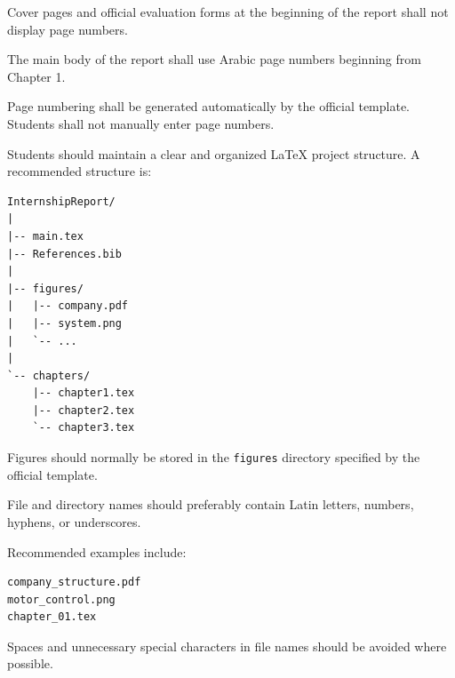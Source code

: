 {\vspace{0.3cm}


\noindent
{}

\vspace{0.15cm}

Cover pages and official evaluation forms at the beginning of the report
shall not display page numbers.

The main body of the report shall use Arabic page numbers beginning from
Chapter 1.

Page numbering shall be generated automatically by the official template.
Students shall not manually enter page numbers.

\vspace{0.3cm}


\noindent
{}

\vspace{0.15cm}

Students should maintain a clear and organized \LaTeX{} project
structure. A recommended structure is:

\begin{verbatim}
InternshipReport/
|
|-- main.tex
|-- References.bib
|
|-- figures/
|   |-- company.pdf
|   |-- system.png
|   `-- ...
|
`-- chapters/
    |-- chapter1.tex
    |-- chapter2.tex
    `-- chapter3.tex
\end{verbatim}

Figures should normally be stored in the \verb|figures| directory
specified by the official template.

File and directory names should preferably contain Latin letters,
numbers, hyphens, or underscores.

Recommended examples include:

\begin{verbatim}
company_structure.pdf
motor_control.png
chapter_01.tex
\end{verbatim}

Spaces and unnecessary special characters in file names should be
avoided where possible.

\vspace{0.3cm}

}
